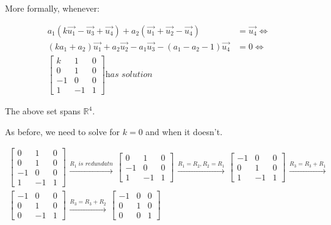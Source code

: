 \documentclass[11pt]{article}
\begin{document}
More formally, whenever:

\begin{align*}
  a_1(k\vec{u_1} - \vec{u_3} + \vec{u_4}) +
  a_2(\vec{u_1} + \vec{u_2} - \vec{u_4}) &= \vec{u_4} \iff \\
  (ka_1 + a_2)\vec{u_1} + a_2\vec{u_2} - a_1\vec{u_3} - (a_1 - a_2 - 1)\vec{u_4} &= 0 \iff \\
  \begin{bmatrix}
    k  & 1  & 0 \\
    0  & 1  & 0 \\
    -1 & 0  & 0 \\
    1  & -1 & 1
  \end{bmatrix} \textit{has solution}
\end{align*}


The above set spans \(\mathbb{R}^4\).

As before, we need to solve for \(k = 0\) and when it doesn't.

\begin{align*}
  \begin{bmatrix}
    0  & 1  & 0 \\
    0  & 1  & 0 \\
    -1 & 0  & 0 \\
    1  & -1 & 1
  \end{bmatrix}
  \begin{aligned} \xrightarrow{R_1 \; \textit{is redundatn}} \end{aligned}
  \begin{bmatrix}
    0  & 1  & 0 \\
    -1 & 0  & 0 \\
    1  & -1 & 1
  \end{bmatrix}
  \begin{aligned} \xrightarrow{R_1 = R_2, R_2 = R_1} \end{aligned}
  \begin{bmatrix}
    -1 & 0  & 0 \\
    0  & 1  & 0 \\
    1  & -1 & 1
  \end{bmatrix}
  \begin{aligned} \xrightarrow{R_3 = R_3 + R_1} \end{aligned} \\
  \begin{bmatrix}
    -1 & 0  & 0 \\
    0  & 1  & 0 \\
    0  & -1 & 1
  \end{bmatrix}
  \begin{aligned} \xrightarrow{R_3 = R_3 + R_2} \end{aligned}
  \begin{bmatrix}
    -1 & 0  & 0 \\
    0  & 1  & 0 \\
    0  & 0 & 1
  \end{bmatrix}
\end{align*}
\end{document}
